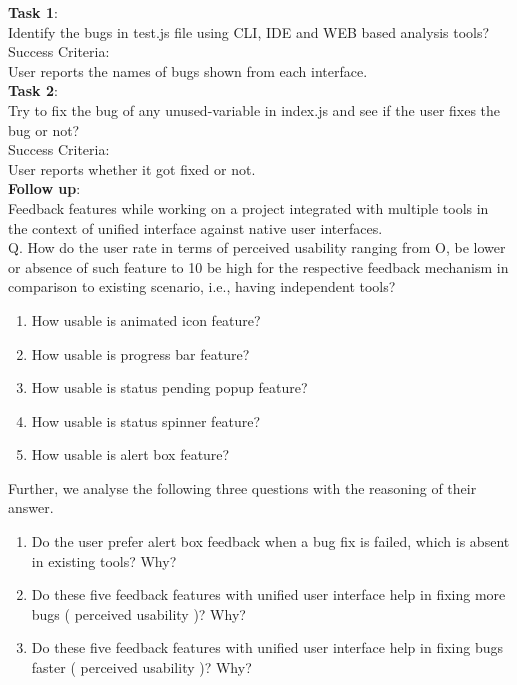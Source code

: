 \textbf{Task 1}: \\

Identify the bugs in test.js file using CLI, IDE and WEB based analysis tools? \\

Success Criteria: \\

User reports the names of bugs shown from each interface. \\


\textbf{Task 2}: \\

Try to fix the bug of any unused-variable in index.js and see if the user fixes the bug or not? \\


Success Criteria: \\

User reports whether it got fixed or not. \\

\textbf{Follow up}: \\

Feedback features while working on a project integrated with multiple tools in the context of unified interface against native user interfaces. \\

Q. How do the user rate in terms of perceived usability ranging from O, be lower or absence of such feature to 10 be high for the respective feedback mechanism in comparison to existing scenario, i.e., having independent tools? \\
\begin{enumerate}
\item  How usable is animated icon feature? 
\item  How usable is progress bar feature? 
\item  How usable is status pending popup feature? 
\item  How usable is status spinner feature? 
\item  How usable is alert box feature? \\
\end{enumerate}

Further, we analyse the following three questions with the reasoning of their answer. \\

\begin{enumerate}
\item Do the user prefer alert box feedback when a bug fix is failed, which is absent in existing tools? Why?
\item Do these five feedback features with unified user interface help in fixing more bugs ( perceived usability )? Why?
\item Do these five feedback features with unified user interface help in fixing bugs faster ( perceived usability )? Why? \\
\end{enumerate}

